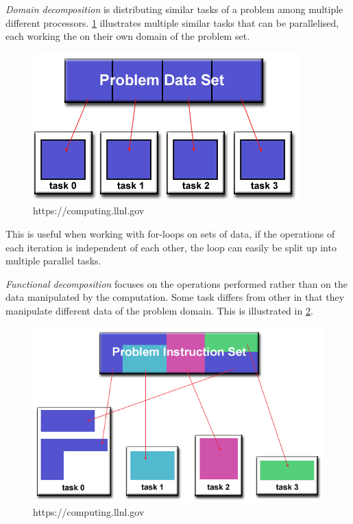 \emph{Domain decomposition} is distributing similar tasks of a problem among multiple different processors. \cref{dom} illustrates multiple similar tasks that can be parallelised, each working the on their own domain of the problem set.

\begin{figure}[htbp]\label{dom}
\includegraphics[width=\textwidth]{Analysis/Supercomputing/domain_decomp.png}
\caption{https://computing.llnl.gov}
\end{figure}

This is useful when working with for-loops on sets of data, if the operations of each iteration is independent of each other, the loop can easily be split up into multiple parallel tasks.

\emph{Functional decomposition} focuses on the operations performed rather than on the data manipulated by the computation. Some task differs from other in that they manipulate different data of the problem domain. This is illustrated in \cref{fun}.

\begin{figure}[htbp]\label{fun}  
\includegraphics[width=\textwidth]{Analysis/Supercomputing/functional_decomp.png}
\caption{https://computing.llnl.gov}
\end{figure}

